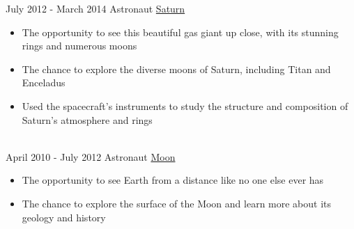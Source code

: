 \begin{twenty}
	\twentyitem
	{July 2012 - }
	{March 2014}
	{Astronaut}
	{\href{https://en.wikipedia.org/wiki/Saturn}{Saturn}}
	{}
	{\begin{itemize}
			\item The opportunity to see this beautiful gas giant up close, with its stunning rings and numerous moons
			\item The chance to explore the diverse moons of Saturn, including Titan and Enceladus
			\item Used the spacecraft's instruments to study the structure and composition of Saturn's atmosphere and rings
		\end{itemize}}
	\\
	\twentyitem
	{April 2010 -}
	{July 2012}
	{Astronaut}
	{\href{https://en.wikipedia.org/wiki/Moon}{Moon}}
	{}
	{
		{\begin{itemize}
					\item The opportunity to see Earth from a distance like no one else ever has
					\item The chance to explore the surface of the Moon and learn more about its geology and history
				\end{itemize}}
	}
	\\
\end{twenty}
